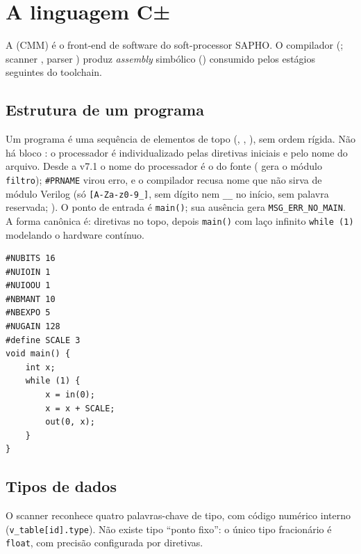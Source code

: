 \section{A linguagem C±}
\label{sec:S03-linguagem-cmm}

A \cmm{} (CMM) é o front-end de software do soft-processor SAPHO. O compilador  (; scanner , parser ) produz \emph{assembly} simbólico () consumido pelos estágios seguintes do toolchain.

\subsection{Estrutura de um programa}

Um programa é uma sequência de elementos de topo (, , ), sem ordem rígida. Não há bloco : o processador é individualizado pelas diretivas iniciais e pelo nome do arquivo. Desde a v7.1 o nome do processador é o do fonte ( gera o módulo \lstinline|filtro|); \lstinline|#PRNAME| virou erro, e o compilador recusa nome que não sirva de módulo Verilog (só \lstinline|[A-Za-z0-9_]|, sem dígito nem \lstinline|__| no início, sem palavra reservada; ). O ponto de entrada é \lstinline|main()|; sua ausência gera \lstinline|MSG_ERR_NO_MAIN|. A forma canônica é: diretivas no topo, depois \lstinline|main()| com laço infinito \lstinline|while (1)| modelando o hardware contínuo.

\begin{lstlisting}[style=cmm]
#NUBITS 16
#NUIOIN 1
#NUIOOU 1
#NBMANT 10
#NBEXPO 5
#NUGAIN 128
#define SCALE 3
void main() {
    int x;
    while (1) {
        x = in(0);
        x = x + SCALE;
        out(0, x);
    }
}
\end{lstlisting}

\subsection{Tipos de dados}

O scanner reconhece quatro palavras-chave de tipo, com código numérico interno (\lstinline|v_table[id].type|). Não existe tipo \enquote{ponto fixo}: o único tipo fracionário é \lstinline|float|, com precisão configurada por diretivas.

